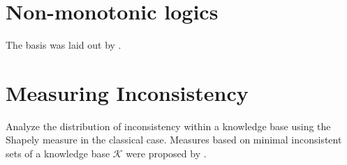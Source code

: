 \section{Non-monotonic logics}
The basis was laid out by \cite{mcdermott_non-monotonic_1980}.

\section{Measuring Inconsistency}
Analyze the distribution of inconsistency within a knowledge base using the Shapely measure \cite{hunter_measure_2010} in the classical case. Measures based on minimal inconsistent sets of a knowledge base \(\mathcal{K}\) \cite{jabbour_mis_2016} were proposed by \cite{ulbricht_measuring_2018}.
